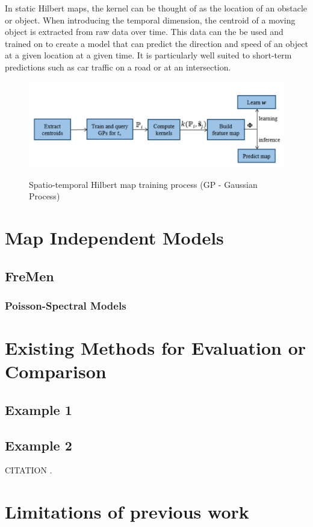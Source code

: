 In static Hilbert maps, the kernel can be thought of as the location of an
obstacle or object. When introducing the temporal dimension, the centroid of a
moving object is extracted from raw data over time. This data can the be used
and trained on to create a model that can predict the direction and speed of an
object at a given location at a given time. It is particularly well suited to
short-term predictions such as car traffic on a road or at an intersection.
\cite{Senanayake2016} \cite{Senanayake2017}

\begin{figure}
  \centering
  \includegraphics[width=\linewidth]{images/STHM_diag.png}
  \caption{Spatio-temporal Hilbert map training process (GP - Gaussian Process)}
  \cite{Senanayake2016}
  \label{figure:example}
\end{figure}

\section{ Map Independent Models }
\subsection{ FreMen }
\subsubsection{ Poisson-Spectral Models }


\section{ Existing Methods for Evaluation or Comparison }

\subsection { Example 1 }
\subsection { Example 2 }


CITATION \cite{art1}.
\section{Limitations of previous work}
